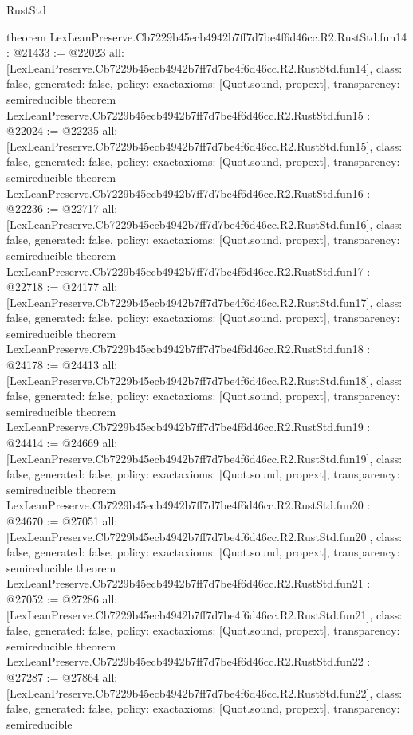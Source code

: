 \begin{lexlean}{RustStd}
\begin{coremodule}
{}
theorem LexLeanPreserve.Cb7229b45ecb4942b7ff7d7be4f6d46cc.R2.RustStd.fun14 : @21433 := @22023 {
  all: [LexLeanPreserve.Cb7229b45ecb4942b7ff7d7be4f6d46cc.R2.RustStd.fun14],
  class: false,
  generated: false,
  policy: exact{axioms: [Quot.sound, propext]},
  transparency: semireducible
}
theorem LexLeanPreserve.Cb7229b45ecb4942b7ff7d7be4f6d46cc.R2.RustStd.fun15 : @22024 := @22235 {
  all: [LexLeanPreserve.Cb7229b45ecb4942b7ff7d7be4f6d46cc.R2.RustStd.fun15],
  class: false,
  generated: false,
  policy: exact{axioms: [Quot.sound, propext]},
  transparency: semireducible
}
theorem LexLeanPreserve.Cb7229b45ecb4942b7ff7d7be4f6d46cc.R2.RustStd.fun16 : @22236 := @22717 {
  all: [LexLeanPreserve.Cb7229b45ecb4942b7ff7d7be4f6d46cc.R2.RustStd.fun16],
  class: false,
  generated: false,
  policy: exact{axioms: [Quot.sound, propext]},
  transparency: semireducible
}
theorem LexLeanPreserve.Cb7229b45ecb4942b7ff7d7be4f6d46cc.R2.RustStd.fun17 : @22718 := @24177 {
  all: [LexLeanPreserve.Cb7229b45ecb4942b7ff7d7be4f6d46cc.R2.RustStd.fun17],
  class: false,
  generated: false,
  policy: exact{axioms: [Quot.sound, propext]},
  transparency: semireducible
}
theorem LexLeanPreserve.Cb7229b45ecb4942b7ff7d7be4f6d46cc.R2.RustStd.fun18 : @24178 := @24413 {
  all: [LexLeanPreserve.Cb7229b45ecb4942b7ff7d7be4f6d46cc.R2.RustStd.fun18],
  class: false,
  generated: false,
  policy: exact{axioms: [Quot.sound, propext]},
  transparency: semireducible
}
theorem LexLeanPreserve.Cb7229b45ecb4942b7ff7d7be4f6d46cc.R2.RustStd.fun19 : @24414 := @24669 {
  all: [LexLeanPreserve.Cb7229b45ecb4942b7ff7d7be4f6d46cc.R2.RustStd.fun19],
  class: false,
  generated: false,
  policy: exact{axioms: [Quot.sound, propext]},
  transparency: semireducible
}
theorem LexLeanPreserve.Cb7229b45ecb4942b7ff7d7be4f6d46cc.R2.RustStd.fun20 : @24670 := @27051 {
  all: [LexLeanPreserve.Cb7229b45ecb4942b7ff7d7be4f6d46cc.R2.RustStd.fun20],
  class: false,
  generated: false,
  policy: exact{axioms: [Quot.sound, propext]},
  transparency: semireducible
}
theorem LexLeanPreserve.Cb7229b45ecb4942b7ff7d7be4f6d46cc.R2.RustStd.fun21 : @27052 := @27286 {
  all: [LexLeanPreserve.Cb7229b45ecb4942b7ff7d7be4f6d46cc.R2.RustStd.fun21],
  class: false,
  generated: false,
  policy: exact{axioms: [Quot.sound, propext]},
  transparency: semireducible
}
theorem LexLeanPreserve.Cb7229b45ecb4942b7ff7d7be4f6d46cc.R2.RustStd.fun22 : @27287 := @27864 {
  all: [LexLeanPreserve.Cb7229b45ecb4942b7ff7d7be4f6d46cc.R2.RustStd.fun22],
  class: false,
  generated: false,
  policy: exact{axioms: [Quot.sound, propext]},
  transparency: semireducible
}
\end{coremodule}
\end{lexlean}
